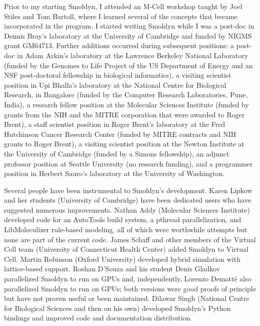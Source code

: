 \documentclass {scrbook}
\begin{document}
Prior to my starting Smoldyn, I attended an M-Cell workshop taught by Joel Stiles and Tom Bartoll, where I learned several of the concepts that became incorporated in the program. I started writing Smoldyn while I was a post-doc in Dennis Bray's laboratory at the University of Cambridge and funded by NIGMS grant GM64713. Further additions occurred during subsequent positions: a post-doc in Adam Arkin's laboratory at the Lawrence Berkeley National Laboratory (funded by the Genomes to Life Project of the US Department of Energy and an NSF post-doctoral fellowship in biological informatics), a visiting scientist position in Upi Bhalla's laboratory at the National Centre for Biological Research, in Bangalore (funded by the Computer Research Laboratories, Pune, India), a research fellow position at the Molecular Sciences Institute (funded by grants from the NIH and the MITRE corporation that were awarded to Roger Brent), a staff scientist position in Roger Brent's laboratory at the Fred Hutchinson Cancer Research Center (funded by MITRE contracts and NIH grants to Roger Brent), a visiting scientist position at the Newton Institute at the University of Cambridge (funded by a Simons fellowship), an adjunct professor position at Seattle University (no research funding), and a programmer position in Herbert Sauro's laboratory at the University of Washington.

Several people have been instrumental to Smoldyn's development. Karen Lipkow and her students (University of Cambridge) have been dedicated users who have suggested numerous improvements. Nathan Addy (Molecular Sciences Institute) developed code for an AutoTools build system, a pthread parallelization, and LibMoleculizer rule-based modeling, all of which were worthwhile attempts but none are part of the current code. James Schaff and other members of the Virtual Cell team (University of Connecticut Health Center) added Smoldyn to Virtual Cell. Martin Robinson (Oxford University) developed hybrid simulation with lattice-based support. Roshan D'Souza and his student Denis Gladkov parallelized Smoldyn to run on GPUs and, independently, Lorenzo Dematt\'{e} also parallelized Smoldyn to run on GPUs; both versions were good proofs of principle but have not proven useful or been maintained. Dilawar Singh (National Centre for Biological Sciences and then on his own) developed Smoldyn's Python bindings and improved code and documentation distribution.



\end{document}
